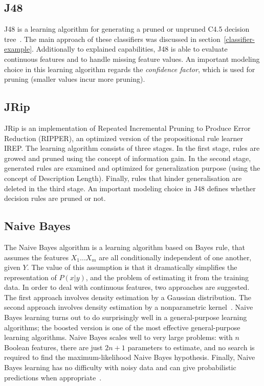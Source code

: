 \subsection{J48}
J48 is a learning algorithm for generating a pruned or unpruned C4.5 decision tree~\cite{J48}. The main approach of these classifiers was discussed in section~\ref{classifier-example}. Additionally to explained capabilities, J48 is able to evaluate continuous features and to handle missing feature values. An important modeling choice in this learning algorithm regards the \textit{confidence factor}, which is used for pruning (smaller values incur more pruning).

\subsection{JRip}
JRip is an implementation of Repeated Incremental Pruning to Produce Error Reduction (RIPPER), an optimized version of the propositional rule learner IREP. The learning algorithm consists of three stages. In the first stage, rules are growed and pruned using the concept of information gain. In the second stage, generated rules are examined and optimized for generalization purpose (using the concept of Description Length). Finally, rules that hinder generalisation are deleted in the third stage. An important modeling choice in J48 defines whether decision rules are pruned or not.~\cite{jrip}

\subsection{Naive Bayes}
The Naive Bayes algorithm is a learning algorithm based on Bayes rule, that assumes the features $X_1 \ldots X_m$ are all conditionally independent of one another, given $Y$. The value of this assumption is that it dramatically simplifies the representation of $P(x|y)$, and the problem of estimating it from the training data. In order to deal with continuous features, two approaches are suggested. The first approach involves density estimation by a Gaussian distribution. The second approach involves density estimation by a nonparametric kernel~\cite{John95estimatingcontinuous}. Naive Bayes learning turns out to do surprisingly well in a general-purpose learning algorithms; the boosted version is one of the most effective general-purpose learning algorithms.  Naive Bayes scales well to very large problems: with $n$ Boolean features, there are just \(2n+1\) parameters to estimate, and no search is required to find the maximum-likelihood Naive Bayes hypothesis.  Finally, Naive Bayes learning has no difficulty with noisy data and can give probabilistic predictions when appropriate~\cite{Russell07Artificial}.

